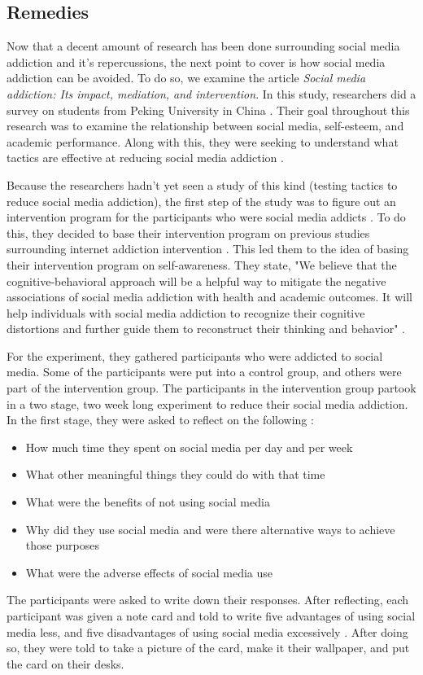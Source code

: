 \documentclass[12pt, journal, compsoc]{IEEEtran}
\begin{document}
\subsection{Remedies}

\hspace{12pt} Now that a decent amount of research has been done surrounding social media addiction and it's repercussions, the next point to cover is how social media addiction can be avoided. To do so, we examine the article \textit{Social media addiction: Its impact, mediation, and intervention}. In this study, researchers did a survey on students from Peking University in China \cite{Intervention}. Their goal throughout this research was to examine the relationship between social media, self-esteem, and academic performance. Along with this, they were seeking to understand what tactics are effective at reducing social media addiction \cite{Intervention}.

Because the researchers hadn't yet seen a study of this kind (testing tactics to reduce social media addiction), the first step of the study was to figure out an intervention program for the participants who were social media addicts \cite{Intervention}. To do this, they decided to base their intervention program on previous studies surrounding internet addiction intervention \cite{Intervention}. This led them to the idea of basing their intervention program on self-awareness. They state, "We believe that the cognitive-behavioral approach will be a helpful way to mitigate the negative associations of social media addiction with health and academic outcomes. It will help individuals with social media addiction to recognize their cognitive distortions and further guide them to reconstruct their thinking and behavior" \cite{Intervention}.

For the experiment, they gathered participants who were addicted to social media. Some of the participants were put into a control group, and others were part of the intervention group. The participants in the intervention group partook in a two stage, two week long experiment to reduce their social media addiction. In the first stage, they were asked to reflect on the following \cite{Intervention}:
\begin{itemize}
    \item How much time they spent on social media per day and per week
    \item What other meaningful things they could do with that time
    \item What were the benefits of not using social media
    \item Why did they use social media and were there alternative ways to achieve those purposes
    \item What were the adverse effects of social media use
\end{itemize}
The participants were asked to write down their responses. After reflecting, each participant was given a note card and told to write five advantages of using social media less, and five disadvantages of using social media excessively \cite{Intervention}. After doing so, they were told to take a picture of the card, make it their wallpaper, and put the card on their desks.
\end{document}
